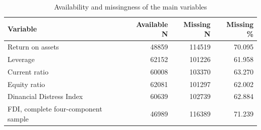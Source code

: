 \begin{table}
\caption{Availability and missingness of the main variables}
\label{tab:missingness}
\begin{tabular}{lrrr}
\toprule
Variable & Available N & Missing N & Missing \% \\
\midrule
Return on assets & 48859 & 114519 & 70.095 \\
Leverage & 62152 & 101226 & 61.958 \\
Current ratio & 60008 & 103370 & 63.270 \\
Equity ratio & 62081 & 101297 & 62.002 \\
Dinancial Distress Index & 60639 & 102739 & 62.884 \\
FDI, complete four-component sample & 46989 & 116389 & 71.239 \\
\bottomrule
\end{tabular}
\end{table}
